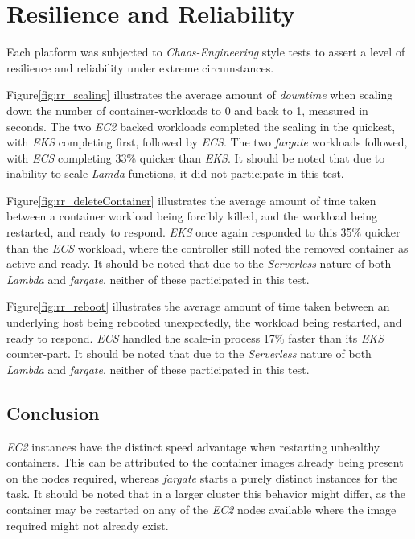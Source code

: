 \section{Resilience and Reliability}
Each platform was subjected to \textit{Chaos-Engineering} style tests to assert a level of resilience and reliability under extreme circumstances.

Figure\ref{fig:rr_scaling} illustrates the average amount of \textit{downtime} when scaling down the number of container-workloads to 0 and back to 1, measured in seconds.
The two \textit{EC2} backed workloads completed the scaling in the quickest, with \textit{EKS} completing first, followed by \textit{ECS}.
The two \textit{fargate} workloads followed, with \textit{ECS} completing 33\% quicker than \textit{EKS}.
It should be noted that due to inability to scale \textit{Lamda} functions, it did not participate in this test.

Figure\ref{fig:rr_deleteContainer} illustrates the average amount of time taken between a container workload being forcibly killed, and the workload being restarted, and ready to respond.
\textit{EKS} once again responded to this 35\% quicker than the \textit{ECS} workload, where the controller still noted the removed container as active and ready.
It should be noted that due to the \textit{Serverless} nature of both \textit{Lambda} and \textit{fargate}, neither of these participated in this test.

Figure\ref{fig:rr_reboot} illustrates the average amount of time taken between an underlying host being rebooted unexpectedly, the workload being restarted, and ready to respond.
\textit{ECS} handled the scale-in process 17\% faster than its \textit{EKS} counter-part.
It should be noted that due to the \textit{Serverless} nature of both \textit{Lambda} and \textit{fargate}, neither of these participated in this test.

\subsection*{Conclusion}
\textit{EC2} instances have the distinct speed advantage when restarting unhealthy containers.
This can be attributed to the container images already being present on the nodes required, whereas \textit{fargate} starts a purely distinct instances for the task.
It should be noted that in a larger cluster this behavior might differ, as the container may be restarted on any of the \textit{EC2} nodes available where the image required might not already exist.

